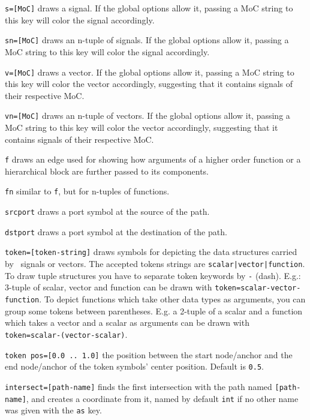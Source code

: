 \begin{optionslist}
\item \texttt{s=[MoC]} draws a signal. If the global options allow it, passing a MoC string to this key will color the signal accordingly. 
\item \texttt{sn=[MoC]} draws an n-tuple of signals. If the global options allow it, passing a MoC string to this key will color the signal accordingly. 
\item \texttt{v=[MoC]} draws a vector. If the global options allow it, passing a MoC string to this key will color the vector accordingly, suggesting that it contains signals of their respective MoC.
\item \texttt{vn=[MoC]} draws an n-tuple of vectors. If the global options allow it, passing a MoC string to this key will color the vector accordingly, suggesting that it contains signals of their respective MoC.
\item \texttt{f} draws an edge used for showing how arguments of a higher order function or a hierarchical block are further passed to its components.  
\item \texttt{fn} similar to \texttt{f}, but for n-tuples of functions.  
\item \texttt{srcport} draws a port symbol at the source of the path.
\item \texttt{dstport} draws a port symbol at the destination of the path.
\item \texttt{token=[token-string]} draws symbols for depicting the data structures carried by \ForSyDe\ signals or vectors. The accepted tokens strings are \texttt{scalar|vector|function}. To draw tuple structures you have to separate token keywords by \texttt{-} (dash). E.g.: 3-tuple of scalar,  vector and function can be drawn with \texttt{token=scalar-vector-function}. To depict functions which take other data types as arguments, you can group some tokens between parentheses. E.g. a 2-tuple of a scalar and a function which takes a vector and a scalar as arguments can be drawn with \texttt{token=scalar-(vector-scalar)}.
\item \texttt{token pos=[0.0 .. 1.0]} the position between the start node/anchor and the end node/anchor of the token symbols' center position. Default is \texttt{0.5}.
\item \texttt{intersect=[path-name]} finds the first intersection with the path named \texttt{[path-name]}, and creates a coordinate from it, named by default \texttt{int} if no other name was given with the \texttt{as} key.

\end{optionslist}
